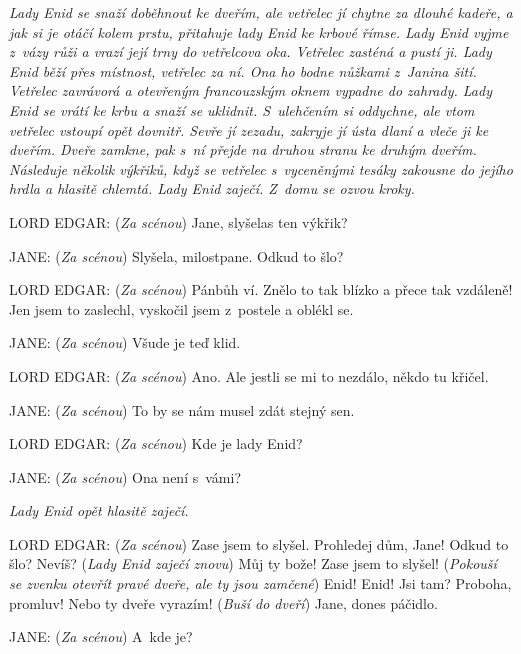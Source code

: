 \smallskip

\noindent
\textit{Lady Enid se snaží doběhnout ke dveřím, ale vetřelec jí chytne za dlouhé kadeře, a jak si je otáčí kolem prstu, přitahuje lady Enid ke krbové římse. Lady Enid vyjme z vázy růži a vrazí její trny do vetřelcova oka. Vetřelec zasténá a pustí ji. Lady Enid běží přes místnost, vetřelec za ní. Ona ho bodne nůžkami z Janina šití. Vetřelec zavrávorá a otevřeným francouzským oknem vypadne do zahrady. Lady Enid se vrátí ke krbu a snaží se uklidnit.  S ulehčením si oddychne, ale vtom vetřelec vstoupí opět dovnitř. Sevře jí zezadu, zakryje jí ústa dlaní a vleče ji ke dveřím. Dveře zamkne, pak s ní přejde na druhou stranu ke druhým dveřím. Následuje několik výkřiků, když se vetřelec s vyceněnými tesáky zakousne do jejího hrdla a hlasitě chlemtá. Lady Enid zaječí. Z domu se ozvou kroky.}

\smallskip

\noindent
LORD EDGAR: (\textit{Za scénou}) Jane, slyšelas ten výkřik?

\noindent
JANE: (\textit{Za scénou}) Slyšela, milostpane. Odkud to šlo?

\noindent
LORD EDGAR: (\textit{Za scénou}) Pánbůh ví. Znělo to tak blízko a přece tak vzdáleně! Jen jsem to zaslechl, vyskočil jsem z postele a oblékl se.

\noindent
JANE: (\textit{Za scénou}) Všude je teď klid.

\noindent
LORD EDGAR: (\textit{Za scénou}) Ano. Ale jestli se mi to nezdálo, někdo tu křičel.

\noindent
JANE: (\textit{Za scénou}) To by se nám musel zdát stejný sen.

\noindent
LORD EDGAR: (\textit{Za scénou}) Kde je lady Enid?

\noindent

\noindent
JANE: (\textit{Za scénou}) Ona není s vámi?

\smallskip

\noindent
\textit{Lady Enid opět hlasitě zaječí.}

\smallskip

\noindent
LORD EDGAR: (\textit{Za scénou}) Zase jsem to slyšel. Prohledej dům, Jane! Odkud to šlo? Nevíš? (\textit{Lady Enid zaječí znovu}) Můj ty bože! Zase jsem to slyšel! (\textit{Pokouší se zvenku otevřít pravé dveře, ale ty jsou zamčené}) Enid! Enid! Jsi tam? Proboha, promluv! Nebo ty dveře vyrazím! (\textit{Buší do dveří}) Jane, dones páčidlo.

\noindent
JANE: (\textit{Za scénou}) A~kde je?

